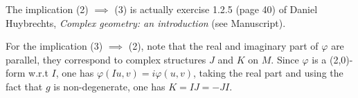 \documentclass[11pt]{article}
\begin{document}
The implication (2) \(\implies\) (3) is actually exercise 1.2.5 (page 40) of Daniel Huybrechts,
\emph{Complex geometry: an introduction} (see Manuscript).

For the implication (3) \(\implies\) (2), note that the real and imaginary part of \(\varphi\) are parallel,
they correspond to complex structures \(J\) and \(K\) on \(M\). Since \(\varphi\) is a (2,0)-form w.r.t
\(I\), one has \(\varphi(Iu, v) = i\varphi(u,v)\), taking the real part and using the fact that \(g\) is
non-degenerate, one has \(K = IJ = -JI\).
\end{document}
